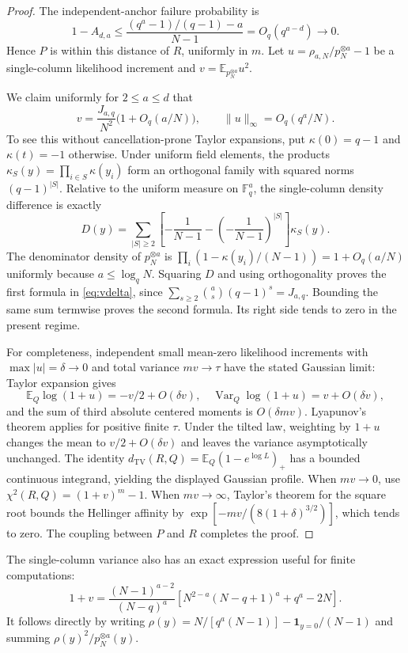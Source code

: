 \documentclass[11pt]{article}
\theoremstyle{remark}\newtheorem{remark}[theorem]{Remark}
\newcommand{\F}{\mathbb F_q}
\newcommand{\E}{\mathbb E}
\newcommand{\TV}{d_{\mathrm{TV}}}
\newcommand{\ind}{\mathbf 1}
\begin{document}
\begin{proof}
The independent-anchor failure probability is
\[
 1-A_{d,a}\le\frac{(q^a-1)/(q-1)-a}{N-1}=O_q(q^{a-d})\longrightarrow0.
\]
Hence $P$ is within this distance of $R$, uniformly in $m$. Let $u=\rho_{a,N}/p_N^{\otimes a}-1$ be a single-column likelihood increment and $v=\E_{p_N^{\otimes a}}u^2$.

We claim uniformly for $2\le a\le d$ that
\begin{equation}\label{eq:vdelta}
 v=\frac{J_{a,q}}{N^2}\bigl(1+O_q(a/N)\bigr),\qquad
 \|u\|_\infty=O_q(q^a/N).
\end{equation}
To see this without cancellation-prone Taylor expansions, put $\kappa(0)=q-1$ and $\kappa(t)=-1$ otherwise. Under uniform field elements, the products $\kappa_S(y)=\prod_{i\in S}\kappa(y_i)$ form an orthogonal family with squared norms $(q-1)^{|S|}$. Relative to the uniform measure on $\F^a$, the single-column density difference is exactly
\[
 D(y)=\sum_{|S|\ge2}\left[-\frac1{N-1}-\left(-\frac1{N-1}\right)^{|S|}\right]\kappa_S(y).
\]
The denominator density of $p_N^{\otimes a}$ is $\prod_i(1-\kappa(y_i)/(N-1))=1+O_q(a/N)$ uniformly because $a\le\log_qN$. Squaring $D$ and using orthogonality proves the first formula in \eqref{eq:vdelta}, since $\sum_{s\ge2}\binom as(q-1)^s=J_{a,q}$. Bounding the same sum termwise proves the second formula. Its right side tends to zero in the present regime.

For completeness, independent small mean-zero likelihood increments with $\max|u|=\delta\to0$ and total variance $mv\to\tau$ have the stated Gaussian limit: Taylor expansion gives
\[
 \E_Q\log(1+u)=-v/2+O(\delta v),\quad
 \operatorname{Var}_Q\log(1+u)=v+O(\delta v),
\]
and the sum of third absolute centered moments is $O(\delta mv)$. Lyapunov's theorem applies for positive finite $\tau$. Under the tilted law, weighting by $1+u$ changes the mean to $v/2+O(\delta v)$ and leaves the variance asymptotically unchanged. The identity $\TV(R,Q)=\E_Q(1-e^{\log L})_+$ has a bounded continuous integrand, yielding the displayed Gaussian profile. When $mv\to0$, use $\chi^2(R,Q)=(1+v)^m-1$. When $mv\to\infty$, Taylor's theorem for the square root bounds the Hellinger affinity by $\exp[-mv/(8(1+\delta)^{3/2})]$, which tends to zero. The coupling between $P$ and $R$ completes the proof.
\end{proof}

The single-column variance also has an exact expression useful for finite computations:
\begin{equation}\label{eq:exact-v}
 1+v=\frac{(N-1)^{a-2}}{(N-q)^a}
 \left[N^{2-a}(N-q+1)^a+q^a-2N\right].
\end{equation}
It follows directly by writing $\rho(y)=N/[q^a(N-1)]-\ind_{y=0}/(N-1)$ and summing $\rho(y)^2/p_N^{\otimes a}(y)$.
\end{document}

